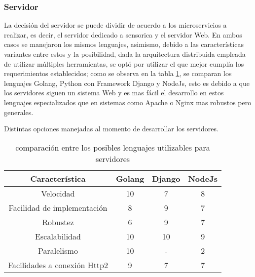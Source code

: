     \subsubsection{Servidor}
    La decisión del servidor se puede  dividir de acuerdo a los
    microservicios a realizar, es decir, el servidor dedicado a sensorica y
    el servidor Web. En ambos casos se manejaron los mismos lenguajes, asimismo, debido a
    las características variantes entre estos y la posibilidad, dada la arquitectura
    distribuida empleada de utilizar múltiples herramientas, se optó por utilizar
    el que mejor cumplía los requerimientos establecidos; como se observa en la
    tabla \ref{tab:LenguajesServidor}, se comparan los lenguajes Golang, Python
    con Framework Django y NodeJs, esto es debido a que los servidores siguen un
    sistema Web y es mas fácil el desarrollo en estos lenguajes especializados que
    en sistemas como Apache o Nginx mas robustos pero generales.

    \begin{table}[ht]
        \caption[Comparativa de posibles lenguajes nivel servidor]{comparación entre
        los posibles lenguajes utilizables para servidores}
        \label{tab:LenguajesServidor}
        \begin{center}
            Distintas opciones manejadas al momento de desarrollar los servidores.\\

            \vspace{0.3cm}
            \begin{tabular}{|c|c|c|c|}
                \hline
                Característica              & Golang & Django & NodeJs\\\hline
                \hline
                Velocidad                   & 10    & 7     &   8   \\\hline
                Facilidad de implementación & 8     & 9     &  7\\\hline
                Robustez                    & 6     & 9     & 7 \\\hline
                Escalabilidad               & 10    & 10    & 9 \\\hline
                Paralelismo                 & 10    & -     & 2 \\\hline
                Facilidades a conexión Http2& 9     &7      & 7 \\
                \hline
            \end{tabular}
        \end{center}
    \end{table}


